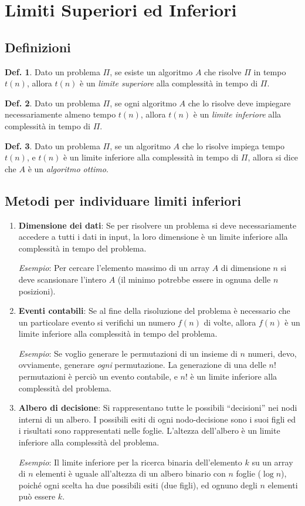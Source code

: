 \documentclass[a4paper,10pt]{article}
\theoremstyle{definition}
\newtheorem{deff}{Def.}[section]
\begin{document}
\section{Limiti Superiori ed Inferiori}
\subsection{Definizioni}
\begin{deff}
    Dato un problema $\Pi$, se esiste un algoritmo $A$ che risolve $\Pi$ in tempo $t(n)$, allora $t(n)$ è un \emph{limite superiore} alla complessità in tempo di $\Pi$. 
\end{deff}
\begin{deff}
    Dato un problema $\Pi$, se ogni algoritmo $A$ che lo risolve deve impiegare necessariamente almeno tempo $t(n)$, allora $t(n)$ è un \emph{limite inferiore} alla complessità in tempo di $\Pi$. 
\end{deff}
\begin{deff}
    Dato un problema $\Pi$, se un algoritmo $A$ che lo risolve impiega tempo $t(n)$, e $t(n)$ è un limite inferiore alla complessità in tempo di $\Pi$, allora si dice che $A$ è un \emph{algoritmo ottimo}. 
\end{deff}
\subsection{Metodi per individuare limiti inferiori}
\begin{enumerate}
 \item \textbf{Dimensione dei dati}: Se per risolvere un problema si deve necessariamente accedere a tutti i dati in input, la loro dimensione è un limite inferiore alla complessità in tempo del problema. \smallskip
 
 \emph{Esempio}: Per cercare l'elemento massimo di un array $A$ di dimensione $n$ si deve scansionare l'intero $A$ (il minimo potrebbe essere in ognuna delle $n$ posizioni).
  \item \textbf{Eventi contabili}: Se al fine della risoluzione del problema è necessario che un particolare evento si verifichi un numero $f(n)$ di volte, allora $f(n)$ è un limite inferiore alla complessità in tempo del problema.\smallskip
  
  \emph{Esempio}: Se voglio generare le permutazioni di un insieme di $n$ numeri, devo, ovviamente, generare \emph{ogni} permutazione. La generazione di una delle $n!$ permutazioni è perciò un evento contabile, e $n!$ è un limite inferiore alla complessità del problema.
  \item \textbf{Albero di decisione}:
  Si rappresentano tutte le possibili ``decisioni'' nei nodi interni di un albero. I possibili esiti di ogni nodo-decisione sono i suoi figli ed i risultati sono rappresentati nelle foglie. L'altezza dell'albero è un limite inferiore alla complessità del problema.\smallskip
  
  \emph{Esempio}: Il limite inferiore per la ricerca binaria dell'elemento $k$ su un array di $n$ elementi è uguale all'altezza di un albero binario con $n$ foglie ($\log n$), poiché ogni scelta ha due possibili esiti (due figli), ed ognuno degli $n$ elementi può essere $k$.
\end{enumerate}
\end{document}
